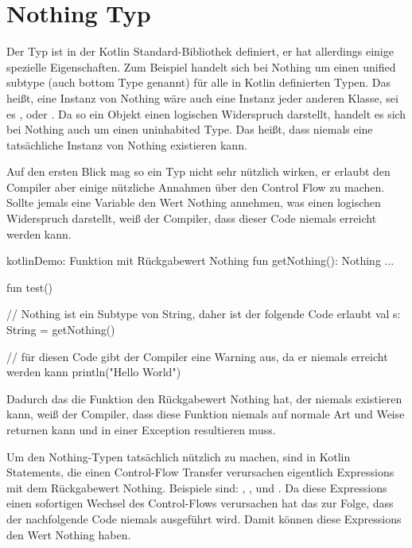
\section{Nothing Typ}\label{sec:nothing-type}

\renewcommand{\kapitelautor}{Autor: Marvin Kurka}

Der  Typ ist in der Kotlin Standard-Bibliothek definiert, er hat allerdings einige
spezielle Eigenschaften.
Zum Beispiel handelt sich bei Nothing um einen unified subtype (auch bottom Type genannt) für alle in Kotlin
definierten Typen.
Das heißt, eine Instanz von Nothing wäre auch eine Instanz jeder anderen Klasse, sei es ,
 oder .
Da so ein Objekt einen logischen Widerspruch darstellt, handelt es sich bei Nothing auch um einen uninhabited Type.
Das heißt, dass niemals eine tatsächliche Instanz von Nothing existieren kann.

Auf den ersten Blick mag so ein Typ nicht sehr nützlich wirken, er erlaubt den Compiler aber einige nützliche
Annahmen über den Control Flow zu machen.
Sollte jemals eine Variable den Wert Nothing annehmen, was einen logischen Widerspruch darstellt, weiß der Compiler,
dass dieser Code niemals erreicht werden kann.\cite{kspeCFG,kspecNothing}

\begin{codeBlock}{kotlin}{Demo: Funktion mit Rückgabewert Nothing}
fun getNothing(): Nothing {
    ...
}

fun test() {
    // Nothing ist ein Subtype von String, daher ist der folgende Code erlaubt
    val s: String = getNothing()

    // für diesen Code gibt der Compiler eine Warning aus, da er niemals erreicht werden kann
    println("Hello World")
}
\end{codeBlock}

Dadurch das die Funktion  den Rückgabewert Nothing hat, der niemals existieren kann,
weiß der Compiler, dass diese Funktion niemals auf normale Art und Weise returnen kann und in einer Exception
resultieren muss.

Um den Nothing-Typen tatsächlich nützlich zu machen, sind in Kotlin Statements, die einen Control-Flow Transfer
verursachen eigentlich Expressions mit dem Rückgabewert Nothing.
Beispiele sind: , ,  und .
Da diese Expressions einen sofortigen Wechsel des Control-Flows verursachen hat das zur Folge, dass der nachfolgende
Code niemals ausgeführt wird.
Damit können diese Expressions den Wert Nothing haben.\cite{kspeCFG}

